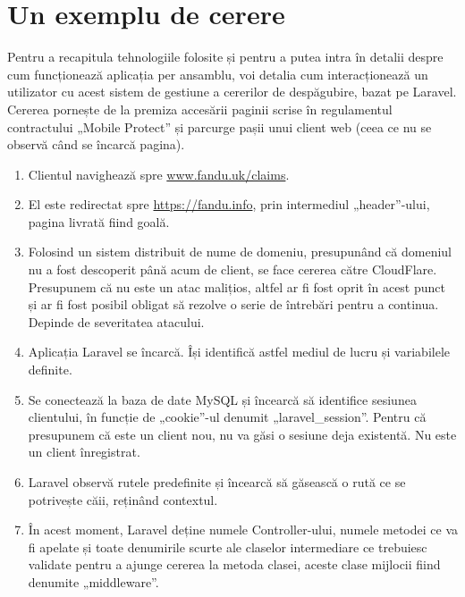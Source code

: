 \section{Un exemplu de cerere}

	Pentru a recapitula tehnologiile folosite și pentru a putea intra în detalii despre cum funcționează aplicația per ansamblu, voi detalia cum interacționează un utilizator cu acest sistem de gestiune a cererilor de despăgubire, bazat pe Laravel.
	Cererea pornește de la premiza accesării paginii scrise în regulamentul contractului „Mobile Protect” și parcurge pașii unui client web (ceea ce nu se observă când se încarcă pagina).
	\begin{enumerate}
		\item
			Clientul navighează spre \url{www.fandu.uk/claims}.
		\item
			El este redirectat spre \url{https://fandu.info}, prin intermediul „header”-ului, pagina livrată fiind goală.
		\item
			Folosind un sistem distribuit de nume de domeniu, presupunând că domeniul nu a fost descoperit până acum de client, se face cererea către CloudFlare.
			Presupunem că nu este un atac malițios, altfel ar fi fost oprit în acest punct și ar fi fost posibil obligat să rezolve o serie de întrebări pentru a continua.
			Depinde de severitatea atacului.
		\item
			Aplicația Laravel se încarcă. Își identifică astfel mediul de lucru și variabilele definite.
		\item
			Se conectează la baza de date MySQL și încearcă să identifice sesiunea clientului, în funcție de „cookie”-ul denumit „laravel\_session”.
			Pentru că presupunem că este un client nou, nu va găsi o sesiune deja existentă.
			Nu este un client înregistrat.
		\item
			Laravel observă rutele predefinite și încearcă să găsească o rută ce se potrivește căii, reținând contextul.
		\item
			În acest moment, Laravel deține numele Controller-ului, numele metodei ce va fi apelate și toate denumirile scurte ale claselor intermediare ce trebuiesc validate pentru a ajunge cererea la metoda clasei, aceste clase mijlocii fiind denumite „middleware”.


\end{enumerate}
